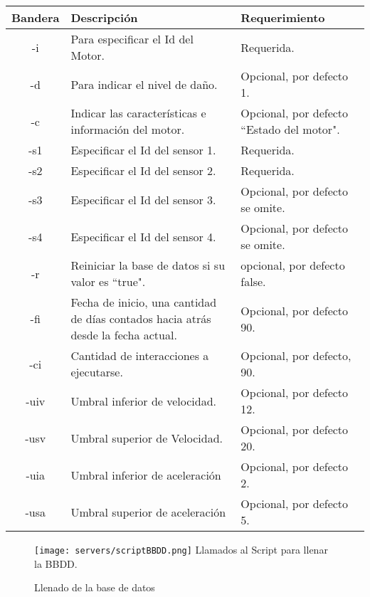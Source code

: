 \begin{table}[ht]
\begin{center}
            \vspace{0.3cm}
            \begin{tabular}{|c|p{7cm}|p{5cm}|}
                \hline
                Bandera & Descripción & Requerimiento \\\hline
                \hline
                -i & Para especificar el Id del Motor. & Requerida.\\\hline
                -d & Para indicar el nivel de daño.  & Opcional, por defecto 1.\\\hline
                -c & Indicar las características e información del motor. & Opcional, por defecto ``Estado del motor".\\\hline
                -s1& Especificar el Id del sensor 1. &Requerida.\\\hline
                -s2& Especificar el Id del sensor 2. &Requerida.\\\hline
                -s3& Especificar el Id del sensor 3. & Opcional, por defecto se omite.\\\hline
                -s4& Especificar el Id del sensor 4.  &Opcional, por defecto se omite.\\\hline
                -r & Reiniciar la base de datos si su valor es ``true".& opcional, por defecto false.\\\hline
                -fi& Fecha de inicio, una cantidad de días contados hacia atrás desde la fecha actual.& Opcional, por defecto 90.\\\hline
                -ci& Cantidad de interacciones a ejecutarse. &Opcional, por defecto, 90.\\\hline
                -uiv& Umbral inferior de velocidad. & Opcional, por defecto 12.\\\hline
                -usv& Umbral superior de Velocidad. & Opcional, por defecto 20.\\\hline
                -uia& Umbral inferior de aceleración   &Opcional, por defecto 2.\\\hline
                -usa& Umbral superior de aceleración  &Opcional, por defecto 5.
                \\\hline
            \end{tabular}
        \end{center}
    \end{table}

	\begin{figure}[ht]
		\centering
        \caption{Llenado de la base de datos}
        \texttt{[image: servers/scriptBBDD.png]}
        Llamados al Script para llenar la BBDD.    \label{img:scriptBBDD}
	\end{figure}

